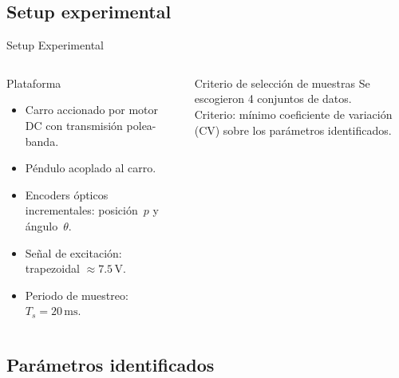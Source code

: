\documentclass[mathserif,spanish,10pt]{beamer}
\begin{document}
\subsection{Setup experimental}

\begin{frame}{Setup Experimental}
\begin{columns}[T]
  \begin{block}{Plataforma}
    \begin{itemize}
      \item Carro accionado por motor DC con transmisión polea-banda.
      \item Péndulo acoplado al carro.
      \item Encoders ópticos incrementales: posición~$p$ y ángulo~$\theta$.
      \item Señal de excitación: trapezoidal $\approx 7.5\,\text{V}$.
      \item Periodo de muestreo: $T_s = 20\,\text{ms}$.
    \end{itemize}
  \end{block}

  \begin{block}{Criterio de selección de muestras}
    \small
    Se escogieron 4 conjuntos de datos.\\
    Criterio: mínimo coeficiente de variación (CV) sobre los parámetros identificados.
  \end{block}

\end{columns}
\end{frame}

\subsection{Parámetros identificados}
\end{document}
